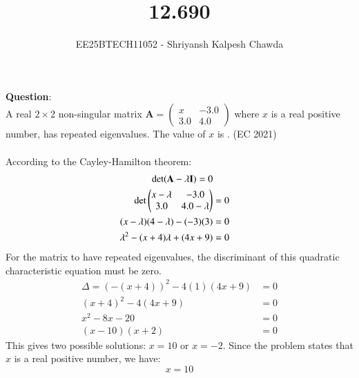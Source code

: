 \documentclass[journal]{IEEEtran}
\begin{document}
	
	
	\vspace{3cm}
	
	\title{12.690}
	\author{EE25BTECH11052 - Shriyansh Kalpesh Chawda}
	{\let\newpage\relax\maketitle}
	
	\renewcommand{\thefigure}{\theenumi}
	\renewcommand{\thetable}{\theenumi}
	\setlength{\intextsep}{10pt} 
	
	\renewcommand{\thetable}{\theenumi}
	\textbf{Question}:\\
A real $2 \times 2$ non-singular matrix $\mathbf{A} = \begin{pmatrix} x & -3.0 \\ 3.0 & 4.0 \end{pmatrix}$ where $x$ is a real positive number, has repeated eigenvalues. The value of $x$ is \underline{\hspace{2cm}}. \hfill (EC 2021)	\\
	\solution\\
According to the Cayley-Hamilton theorem:
\begin{align}
	\det(\mathbf{A} - \lambda\mathbf{I}) = 0\\
	\det\begin{pmatrix}x - \lambda & -3.0 \\ 3.0 & 4.0 - \lambda\end{pmatrix} &= 0 \\
	(x-\lambda)(4-\lambda) - (-3)(3) &= 0 \\
	\lambda^2 - (x+4)\lambda + (4x+9) &= 0
\end{align}
For the matrix to have repeated eigenvalues, the discriminant of this quadratic characteristic equation must be zero.
\begin{align}
	\Delta = (-(x+4))^2 - 4(1)(4x+9) &= 0 \\
	(x+4)^2 - 4(4x+9) &= 0 \\
	x^2 - 8x - 20 &= 0\\
	(x-10)(x+2) &= 0
\end{align}
This gives two possible solutions: $x=10$ or $x=-2$. Since the problem states that $x$ is a real positive number, we have:
$$ x = 10 $$	


	
	
	
\end{document}
